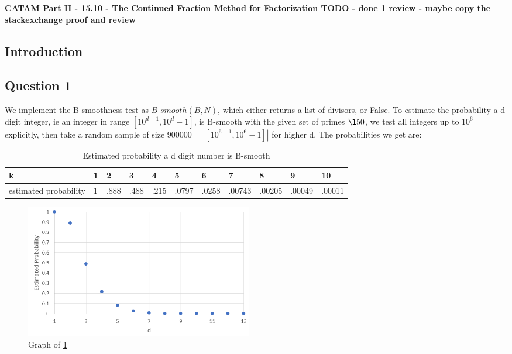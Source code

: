 \documentclass[10pt,a4paper]{report}
\begin{document}
\textbf{CATAM Part II - 15.10 - The Continued Fraction Method for
Factorization TODO - done 1 review - maybe copy the stackexchange proof and review}
\thispagestyle{empty}

\newpage

\subsection*{Introduction}

\subsection*{Question 1}
We implement the B smoothness test as $B\_smooth(B,N)$, which either returns a list of divisors, or False. To estimate the probability a d-digit integer, ie an integer in range $[10^{d-1},10^d-1]$, is B-smooth with the given set of primes $\l 50$, we test all integers up to $10^6$ explicitly, then take a random sample of size $900000 = | [10^{6-1},10^6-1] |$ for higher d. The probabilities we get are:

\begin{table}[h]
\centering
\begin{tabular}{|l|l|l|l|l|l|l|l|l|l|l|}
\hline
k                     & 1 & 2    & 3    & 4    & 5     & 6     & 7      & 8      & 9      & 10     \\ \hline
estimated probability & 1 & .888 & .488 & .215 & .0797 & .0258 & .00743 & .00205 & .00049 & .00011 \\ \hline
\end{tabular}
\caption{Estimated probability a d digit number is B-smooth}
\label{tab:my-table}
\end{table}

\begin{figure}[h]
\centering
\includegraphics[width=10cm]{q1graph.png}
\caption{Graph of \ref{tab:my-table}}
\end{figure}
\end{document}
